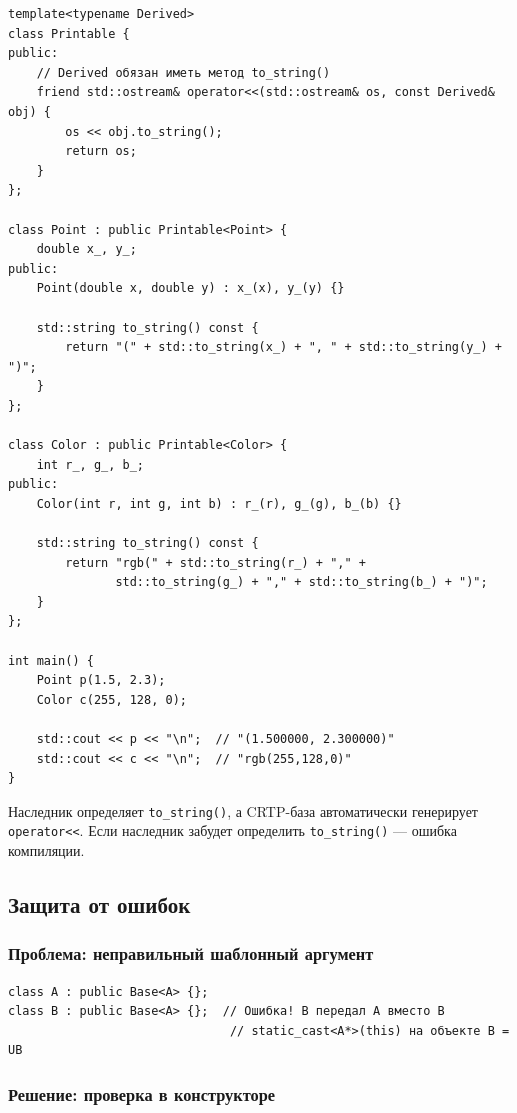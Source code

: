 \documentclass[a4paper,12pt]{article}
\begin{document}
\begin{lstlisting}
template<typename Derived>
class Printable {
public:
    // Derived обязан иметь метод to_string()
    friend std::ostream& operator<<(std::ostream& os, const Derived& obj) {
        os << obj.to_string();
        return os;
    }
};

class Point : public Printable<Point> {
    double x_, y_;
public:
    Point(double x, double y) : x_(x), y_(y) {}

    std::string to_string() const {
        return "(" + std::to_string(x_) + ", " + std::to_string(y_) + ")";
    }
};

class Color : public Printable<Color> {
    int r_, g_, b_;
public:
    Color(int r, int g, int b) : r_(r), g_(g), b_(b) {}

    std::string to_string() const {
        return "rgb(" + std::to_string(r_) + "," +
               std::to_string(g_) + "," + std::to_string(b_) + ")";
    }
};

int main() {
    Point p(1.5, 2.3);
    Color c(255, 128, 0);

    std::cout << p << "\n";  // "(1.500000, 2.300000)"
    std::cout << c << "\n";  // "rgb(255,128,0)"
}
\end{lstlisting}

Наследник определяет \texttt{to\_string()}, а CRTP-база автоматически
генерирует \texttt{operator<<}. Если наследник забудет определить
\texttt{to\_string()} --- ошибка компиляции.

\subsection{Защита от ошибок}
\label{sec:crtp-protection}

\subsubsection{Проблема: неправильный шаблонный аргумент}

\begin{lstlisting}
class A : public Base<A> {};
class B : public Base<A> {};  // Ошибка! B передал A вместо B
                               // static_cast<A*>(this) на объекте B = UB
\end{lstlisting}

\subsubsection{Решение: проверка в конструкторе}
\end{document}
